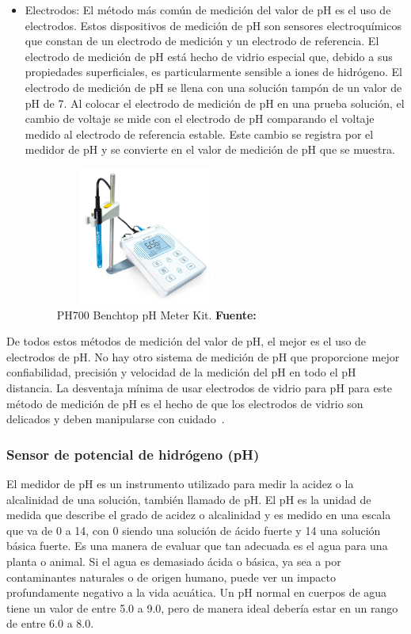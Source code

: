 \begin{itemize}
    \item Electrodos: El método más común de medición del valor de pH es el uso de electrodos.
    Estos dispositivos de medición de pH son sensores electroquímicos que constan de un electrodo de medición y un electrodo de referencia. 
    El electrodo de medición de pH está hecho de vidrio especial que, debido a sus propiedades superficiales, es particularmente sensible a iones de hidrógeno. 
    El electrodo de medición de pH se llena con una solución tampón de un valor de pH de 7. 
    Al colocar el electrodo de medición de pH en una prueba soluci\'on, el cambio de voltaje se mide con el electrodo de pH comparando el voltaje medido al electrodo de referencia estable. 
    Este cambio se registra por el medidor de pH y se convierte en el valor de medición de pH que se muestra.
    
    \begin{figure}[H]
        \centering
        \includegraphics[width=60mm, height=45mm]{Imagenes/cap2/ph700.png}
        \caption {PH700 Benchtop pH Meter Kit. \textbf{Fuente:}
        \cite{ph700_nodate} }
        \label{fig:ph700}
        \end{figure}
\end{itemize}

    De todos estos métodos de medición del valor de pH,  el mejor es el uso de electrodos de pH. 
    No hay otro sistema de medición de pH que proporcione mejor confiabilidad, precisión y velocidad de la medición del pH en todo el pH distancia. 
    La desventaja mínima de usar electrodos de vidrio para pH para este método de medición de pH es el hecho de que los electrodos de vidrio son delicados y deben manipularse con cuidado~\cite{li_chapter_2019}.

\subsubsection{Sensor de potencial de hidrógeno (pH)}

El medidor de pH es un instrumento utilizado para medir la acidez o la alcalinidad de una solución, también llamado de pH. El pH es la unidad de medida que describe el grado de acidez o alcalinidad y es medido en una escala que va de 0 a 14, con 0 siendo una solución de ácido fuerte y 14 una solución básica fuerte.
Es una manera de evaluar que tan adecuada es el agua para una planta o animal.  Si el agua es demasiado ácida o básica, ya sea a por contaminantes naturales o de origen humano, puede ver un impacto profundamente negativo a la vida acuática.  Un pH normal en cuerpos de agua tiene un valor de entre 5.0 a 9.0, pero de manera ideal debería estar en un rango de entre 6.0 a 8.0. %


